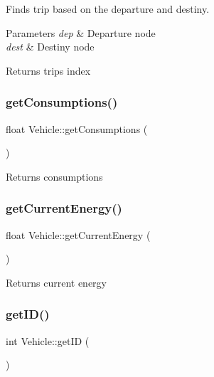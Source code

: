 Finds trip based on the departure and destiny. 


\begin{DoxyParams}{Parameters}
{\em dep} & Departure node \\
\hline
{\em dest} & Destiny node \\
\hline
\end{DoxyParams}
\begin{DoxyReturn}{Returns}
trip\textquotesingle{}s index 
\end{DoxyReturn}
\mbox{\label{class_vehicle_a8449770d06c218d8168b5f834f4c2feb}} 
\subsubsection{\texorpdfstring{get\+Consumptions()}{getConsumptions()}}
{\footnotesize\ttfamily float Vehicle\+::get\+Consumptions (\begin{DoxyParamCaption}{ }\end{DoxyParamCaption})}

\begin{DoxyReturn}{Returns}
consumptions 
\end{DoxyReturn}
\mbox{\label{class_vehicle_a72d38fc28c1d3aa9d0476de3a5704764}} 
\subsubsection{\texorpdfstring{get\+Current\+Energy()}{getCurrentEnergy()}}
{\footnotesize\ttfamily float Vehicle\+::get\+Current\+Energy (\begin{DoxyParamCaption}{ }\end{DoxyParamCaption})}

\begin{DoxyReturn}{Returns}
current energy 
\end{DoxyReturn}
\mbox{\label{class_vehicle_a65fb09187931545d0a9e695f619ac807}} 
\subsubsection{\texorpdfstring{get\+I\+D()}{getID()}}
{\footnotesize\ttfamily int Vehicle\+::get\+ID (\begin{DoxyParamCaption}{ }\end{DoxyParamCaption})}


